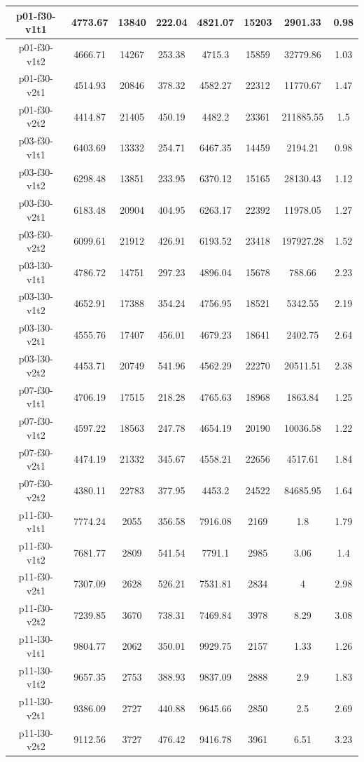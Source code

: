 \begin{table}
\begin {tabular}[b]{|c|c|c|c|c|c|c|c|}
p01-f30-v1t1	&	4773.67	&	13840	&	222.04	&	4821.07	&	15203	&	2901.33	&	0.98	\\\hline
p01-f30-v1t2	&	4666.71	&	14267	&	253.38	&	4715.3	&	15859	&	32779.86	&	1.03	\\\hline
p01-f30-v2t1	&	4514.93	&	20846	&	378.32	&	4582.27	&	22312	&	11770.67	&	1.47	\\\hline
p01-f30-v2t2	&	4414.87	&	21405	&	450.19	&	4482.2	&	23361	&	211885.55	&	1.5	\\\hline \hline
p03-f30-v1t1	&	6403.69	&	13332	&	254.71	&	6467.35	&	14459	&	2194.21	&	0.98	\\\hline
p03-f30-v1t2	&	6298.48	&	13851	&	233.95	&	6370.12	&	15165	&	28130.43	&	1.12	\\\hline
p03-f30-v2t1	&	6183.48	&	20904	&	404.95	&	6263.17	&	22392	&	11978.05	&	1.27	\\\hline
p03-f30-v2t2	&	6099.61	&	21912	&	426.91	&	6193.52	&	23418	&	197927.28	&	1.52	\\\hline \hline
p03-l30-v1t1	&	4786.72	&	14751	&	297.23	&	4896.04	&	15678	&	788.66	&	2.23	\\\hline
p03-l30-v1t2	&	4652.91	&	17388	&	354.24	&	4756.95	&	18521	&	5342.55	&	2.19	\\\hline
p03-l30-v2t1	&	4555.76	&	17407	&	456.01	&	4679.23	&	18641	&	2402.75	&	2.64	\\\hline
p03-l30-v2t2	&	4453.71	&	20749	&	541.96	&	4562.29	&	22270	&	20511.51	&	2.38	\\\hline \hline
p07-f30-v1t1	&	4706.19	&	17515	&	218.28	&	4765.63	&	18968	&	1863.84	&	1.25	\\\hline
p07-f30-v1t2	&	4597.22	&	18563	&	247.78	&	4654.19	&	20190	&	10036.58	&	1.22	\\\hline
p07-f30-v2t1	&	4474.19	&	21332	&	345.67	&	4558.21	&	22656	&	4517.61	&	1.84	\\\hline
p07-f30-v2t2	&	4380.11	&	22783	&	377.95	&	4453.2	&	24522	&	84685.95	&	1.64	\\\hline \hline
p11-f30-v1t1	&	7774.24	&	2055	&	356.58	&	7916.08	&	2169	&	1.8	&	1.79	\\\hline
p11-f30-v1t2	&	7681.77	&	2809	&	541.54	&	7791.1	&	2985	&	3.06	&	1.4	\\\hline
p11-f30-v2t1	&	7307.09	&	2628	&	526.21	&	7531.81	&	2834	&	4	&	2.98	\\\hline
p11-f30-v2t2	&	7239.85	&	3670	&	738.31	&	7469.84	&	3978	&	8.29	&	3.08	\\\hline \hline
p11-l30-v1t1	&	9804.77	&	2062	&	350.01	&	9929.75	&	2157	&	1.33	&	1.26	\\\hline
p11-l30-v1t2	&	9657.35	&	2753	&	388.93	&	9837.09	&	2888	&	2.9	&	1.83	\\\hline
p11-l30-v2t1	&	9386.09	&	2727	&	440.88	&	9645.66	&	2850	&	2.5	&	2.69	\\\hline
p11-l30-v2t2	&	9112.56	&	3727	&	476.42	&	9416.78	&	3961	&	6.51	&	3.23	\\\hline \hline

\end{tabular}
\end{table} 

